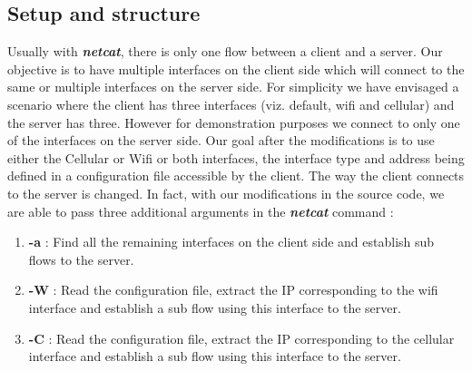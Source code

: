 \documentclass[a4paper,11pt]{article}
\begin{document}
		\subsection{Setup and structure}
			\label{subsec:setup}
			Usually with \textbf{\emph{netcat}}, there is only one flow between a client and a server. Our objective is to have multiple interfaces on the client side which will connect to the same or multiple interfaces on the server side. For simplicity we have envisaged a scenario where the client has three interfaces (viz. default, wifi and cellular) and the server has three. However for demonstration purposes we connect to only one of the interfaces on the server side. Our goal after the modifications is to use either the Cellular or Wifi or both interfaces, the interface type and address being defined in a configuration file accessible by the client. The way the client connects to the server is changed. In fact, with our modifications in the source code, we are able to pass three additional arguments in the \textbf{\emph{netcat}} command :

			\begin{enumerate}
				\item \textbf{-a} : Find all the remaining interfaces on the client side and establish sub flows to the server.
				\item \textbf{-W} : Read the configuration file, extract the IP corresponding to the wifi interface and establish a sub flow using this interface to the server.
				\item \textbf{-C} : Read the configuration file, extract the IP corresponding to the cellular interface and establish a sub flow using this interface to the server.
			\end{enumerate}
\end{document}
